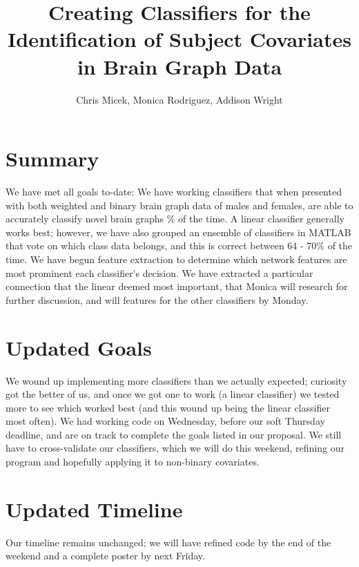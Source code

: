 \documentclass[11pt]{article} %
\title{Creating Classifiers for the Identification of Subject Covariates in Brain Graph Data}
\author{Chris Micek, Monica Rodriguez, Addison Wright}
\newcommand{\textapprox}{\raisebox{0.5ex}{\texttildelow}}
\begin{document}
\maketitle

\section{Summary}
We have met all goals to-date: We have working classifiers that when presented with both weighted and binary brain graph data of males and females, are able to accurately classify novel brain graphs \textapprox{68}\% of the time. A linear classifier generally works best; however, we have also grouped an ensemble of classifiers in MATLAB that vote on which class data belongs, and this is correct between 64 - 70\% of the time. We have begun feature extraction to determine which network features are most prominent each classifier's decision. We have extracted a particular connection that the linear deemed most important, that Monica will research for further discussion, and will features for the other classifiers by Monday.

\section{Updated Goals}
We wound up implementing more classifiers than we actually expected; curiosity got the better of us, and once we got one to work (a linear classifier) we tested more to see which worked best (and this wound up being the linear classifier most often). We had working code on Wednesday, before our soft Thursday deadline, and are on track to complete the goals listed in our proposal. We still have to cross-validate our classifiers, which we will do this weekend, refining our program and hopefully applying it to non-binary covariates.

\section{Updated Timeline}
Our timeline remains unchanged; we will have refined code by the end of the weekend and a complete poster by next Friday.

{}

\end{document}
